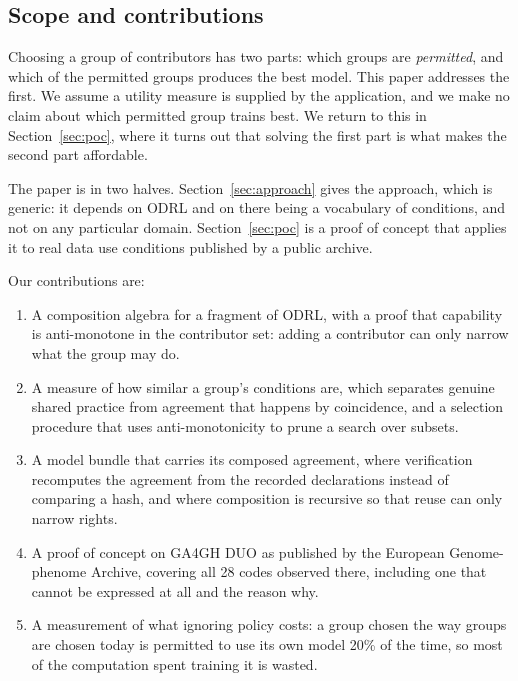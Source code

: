 \documentclass[sigconf,anonymous,review]{acmart}
\begin{document}
\subsection{Scope and contributions}

Choosing a group of contributors has two parts: which groups are
\emph{permitted}, and which of the permitted groups produces the best model. This
paper addresses the first. We assume a utility measure is supplied by the
application, and we make no claim about which permitted group trains best. We
return to this in Section~\ref{sec:poc}, where it turns out that solving the
first part is what makes the second part affordable.

The paper is in two halves. Section~\ref{sec:approach} gives the approach, which
is generic: it depends on ODRL and on there being a vocabulary of conditions, and
not on any particular domain. Section~\ref{sec:poc} is a proof of concept that
applies it to real data use conditions published by a public archive.

Our contributions are:

\begin{enumerate}
\item A composition algebra for a fragment of ODRL, with a proof that capability
is anti-monotone in the contributor set: adding a contributor can only narrow
what the group may do.
\item A measure of how similar a group's conditions are, which separates genuine
shared practice from agreement that happens by coincidence, and a selection
procedure that uses anti-monotonicity to prune a search over subsets.
\item A model bundle that carries its composed agreement, where verification
recomputes the agreement from the recorded declarations instead of comparing a
hash, and where composition is recursive so that reuse can only narrow rights.
\item A proof of concept on GA4GH DUO as published by the European
Genome-phenome Archive, covering all 28 codes observed there, including one that
cannot be expressed at all and the reason why.
\item A measurement of what ignoring policy costs: a group chosen the way groups
are chosen today is permitted to use its own model 20\% of the time, so most of
the computation spent training it is wasted.
\end{enumerate}

\end{document}
